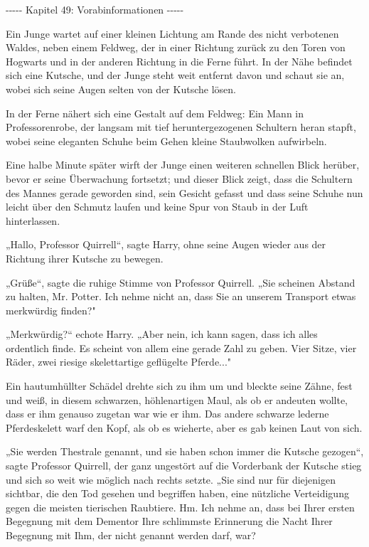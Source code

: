 

\hypertarget{vorabinformationen}{%

-\/-\/-\/-\/- Kapitel 49: Vorabinformationen -\/-\/-\/-\/-

Ein Junge wartet auf einer kleinen Lichtung am Rande des nicht verbotenen Waldes, neben einem Feldweg, der in einer Richtung zurück zu den Toren von Hogwarts und in der anderen Richtung in die Ferne führt. In der Nähe befindet sich eine Kutsche, und der Junge steht weit entfernt davon und schaut sie an, wobei sich seine Augen selten von der Kutsche lösen.

In der Ferne nähert sich eine Gestalt auf dem Feldweg: Ein Mann in Professorenrobe, der langsam mit tief heruntergezogenen Schultern heran stapft, wobei seine eleganten Schuhe beim Gehen kleine Staubwolken aufwirbeln.

Eine halbe Minute später wirft der Junge einen weiteren schnellen Blick herüber, bevor er seine Überwachung fortsetzt; und dieser Blick zeigt, dass die Schultern des Mannes gerade geworden sind, sein Gesicht gefasst und dass seine Schuhe nun leicht über den Schmutz laufen und keine Spur von Staub in der Luft hinterlassen.

„Hallo, Professor Quirrell“, sagte Harry, ohne seine Augen wieder aus der Richtung ihrer Kutsche zu bewegen.

„Grüße“, sagte die ruhige Stimme von Professor Quirrell. „Sie scheinen Abstand zu halten, Mr. Potter. Ich nehme nicht an, dass Sie an unserem Transport etwas merkwürdig finden?"

„Merkwürdig?“ echote Harry. „Aber nein, ich kann sagen, dass ich alles ordentlich finde. Es scheint von allem eine gerade Zahl zu geben. Vier Sitze, vier Räder, zwei riesige skelettartige geflügelte Pferde..."

Ein hautumhüllter Schädel drehte sich zu ihm um und bleckte seine Zähne, fest und weiß, in diesem schwarzen, höhlenartigen Maul, als ob er andeuten wollte, dass er ihm genauso zugetan war wie er ihm. Das andere schwarze lederne Pferdeskelett warf den Kopf, als ob es wieherte, aber es gab keinen Laut von sich.

„Sie werden Thestrale genannt, und sie haben schon immer die Kutsche gezogen“, sagte Professor Quirrell, der ganz ungestört auf die Vorderbank der Kutsche stieg und sich so weit wie möglich nach rechts setzte. „Sie sind nur für diejenigen sichtbar, die den Tod gesehen und begriffen haben, eine nützliche Verteidigung gegen die meisten tierischen Raubtiere. Hm. Ich nehme an, dass bei Ihrer ersten Begegnung mit dem Dementor Ihre schlimmste Erinnerung die Nacht Ihrer Begegnung mit Ihm, der nicht genannt werden darf, war?

}
